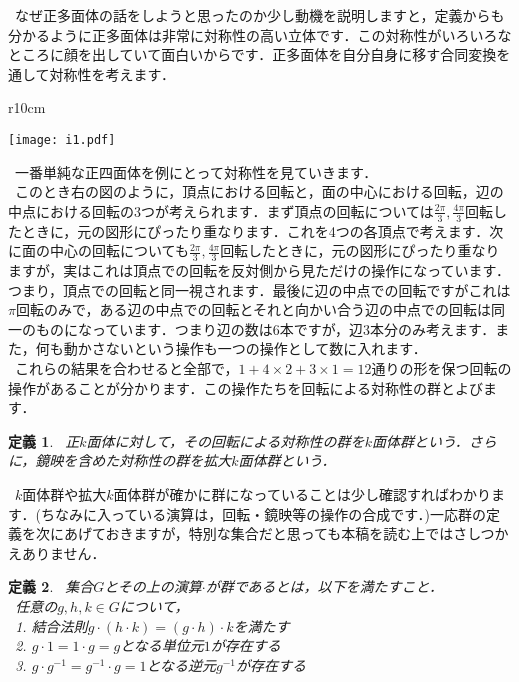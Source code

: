 \documentclass[./main]{subfiles}
\theoremstyle{idefinition}
\newtheorem{idefi}{定義}[section]
\begin{document}
\ なぜ正多面体の話をしようと思ったのか少し動機を説明しますと，定義からも分かるように正多面体は非常に対称性の高い立体です．この対称性がいろいろなところに顔を出していて面白いからです．正多面体を自分自身に移す合同変換を通して対称性を考えます．\\

\newpage

\begin{wrapfigure}{r}{10cm}
\vspace{-4\baselineskip}
\begin{center}
\texttt{[image: i1.pdf]}
\end{center}
\vspace{-3\baselineskip}
\end{wrapfigure}


\ 一番単純な正四面体を例にとって対称性を見ていきます．\\
\ このとき右の図のように，頂点における回転と，面の中心における回転，辺の中点における回転の$3$つが考えられます．まず頂点の回転については$\frac{2\pi}{3},\frac{4\pi}{3}$回転したときに，元の図形にぴったり重なります．これを4つの各頂点で考えます．次に面の中心の回転についても$\frac{2\pi}{3},\frac{4\pi}{3}$回転したときに，元の図形にぴったり重なりますが，実はこれは頂点での回転を反対側から見ただけの操作になっています．つまり，頂点での回転と同一視されます．最後に辺の中点での回転ですがこれは$\pi$回転のみで，ある辺の中点での回転とそれと向かい合う辺の中点での回転は同一のものになっています．つまり辺の数は6本ですが，辺3本分のみ考えます．また，何も動かさないという操作も一つの操作として数に入れます．\\
\ これらの結果を合わせると全部で，$1+4\times2 +3 \times 1 =12$通りの形を保つ回転の操作があることが分かります．この操作たちを回転による対称性の群とよびます．\\


\begin{idefi}
\ 正$k$面体に対して，その回転による対称性の群を$k$面体群という．さらに，鏡映を含めた対称性の群を拡大$k$面体群という．
\end{idefi}

\ $k$面体群や拡大$k$面体群が確かに群になっていることは少し確認すればわかります．(ちなみに入っている演算は，回転・鏡映等の操作の合成です．)一応群の定義を次にあげておきますが，特別な集合だと思っても本稿を読む上ではさしつかえありません．\\

\begin{idefi}
\ 集合$G$とその上の演算$\cdot$が群であるとは，以下を満たすこと．\\
\ 任意の$g,h,k \in G$について，\\
\ 1. 結合法則$g\cdot(h\cdot k)=(g\cdot h)\cdot k$を満たす\\
\ 2. $g\cdot 1=1 \cdot g=g$となる単位元$1$が存在する\\
\ 3. $g\cdot g^{-1}=g^{-1}\cdot g=1$となる逆元$g^{-1}$が存在する\\
\end{idefi}
\end{document}
